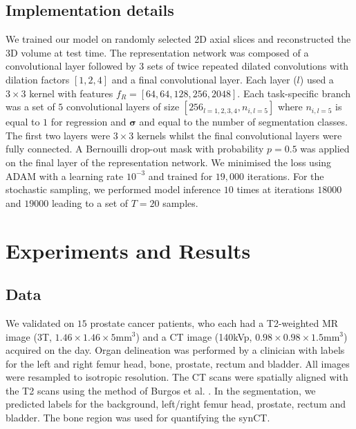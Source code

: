 \subsection{Implementation details}\label{sec:imp_details} 
We trained our model on randomly selected 2D axial slices and reconstructed the 3D volume at test time. The representation network was composed of a convolutional layer followed by $3$ sets of twice repeated dilated convolutions with dilation factors $[1,2,4]$ and a final convolutional layer. Each layer ($l$) used a $3 \times 3$ kernel with features $f_{R}=[64, 64, 128, 256, 2048]$. Each task-specific branch was a set of $5$ convolutional layers of size $[256_{l=1, 2, 3, 4},n_{i,l=5}]$ where $n_{i,l=5}$ is equal to $1$ for regression and $\bm{\sigma}$ and equal to the number of segmentation classes. The first two layers were $3 \times 3$ kernels whilst the final convolutional layers were fully connected. A Bernouilli drop-out mask with probability $p=0.5$ was applied on the final layer of the representation network. We minimised the loss using ADAM with a learning rate $10^{-3}$ and trained for $19,000$ iterations. For the stochastic sampling, we performed model inference $10$ times at iterations $18000$ and $19000$ leading to a set of $T=20$ samples. 

\section{Experiments and Results}


\subsection{Data}
We validated on $15$ prostate cancer patients, who each had a T2-weighted MR image (3T, $1.46\times1.46\times5$mm$^{3}$) and a CT image (140kVp, $0.98\times0.98\times1.5$mm$^{3}$) acquired on the day. Organ delineation was performed by a clinician with labels for the left and right femur head, bone, prostate, rectum and bladder. All images were resampled to isotropic resolution. The CT scans were spatially aligned with the T2 scans using the method of Burgos et al. \cite{ninon2017}. In the segmentation, we predicted labels for the background, left/right femur head, prostate, rectum and bladder. The bone region was used for quantifying the synCT.

